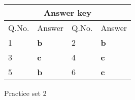 \setlength\arrayrulewidth{1pt}
\begin{table}[H]
	\centering
	
	\begin{tabular}{|p{1.5cm}|p{1.5cm}||p{1.5cm}|p{1.5cm}|}
		\hline
		\multicolumn{4}{|c|}{\textbf{Answer key}}\\\hline\hline
		\rowcolor{ocrel}Q.No.&Answer&Q.No.&Answer\\\hline
		1&\textbf{b}&2&\textbf{b}\\\hline
		3&\textbf{c}&4&\textbf{c}\\\hline
		5&\textbf{b}&6&\textbf{c}\\\hline
	\end{tabular}
\end{table}
\newpage
\begin{abox}
	Practice set 2 
	\end{abox}
